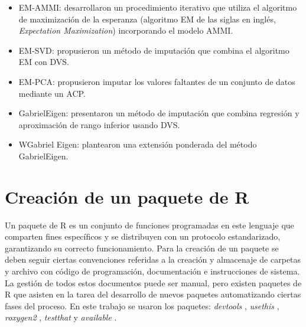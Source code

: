 \begin{itemize}
\item EM-AMMI: \citet{GauchZobel1990} desarrollaron un procedimiento iterativo que utiliza el algoritmo de maximización de la esperanza (algoritmo EM de las siglas en inglés, \emph{Expectation Maximization}) incorporando el modelo AMMI. 
\end{itemize}
\begin{itemize}
\item EM-SVD: \citet{Troyanskayaetal2001} propusieron un método de imputación que combina el algoritmo EM con DVS. 
\end{itemize}
\begin{itemize}
\item EM-PCA: \citet{JosseHusson2016} propusieron imputar los valores faltantes de un conjunto de datos mediante un ACP.
\end{itemize}
\begin{itemize}
\item GabrielEigen: \citet{Alarconetal2010} presentaron un método de imputación que combina regresión y aproximación de rango inferior usando DVS. 
\end{itemize}
\begin{itemize}
\item WGabriel Eigen: \citet{Alarconetal2014} plantearon una extensión ponderada del método GabrielEigen.
\end{itemize}


\section{Creación de un paquete de R}


Un paquete de R es un conjunto de funciones programadas en este lenguaje que comparten fines específicos y se distribuyen con un protocolo estandarizado, garantizando su correcto funcionamiento. Para la creación de un paquete se deben seguir ciertas convenciones referidas a la creación y almacenaje de carpetas y archivo con código de programación, documentación e instrucciones de sistema. La gestión de todos estos documentos puede ser manual, pero existen paquetes de R que asisten en la tarea del desarrollo de nuevos paquetes automatizando ciertas fases del proceso. En este trabajo se usaron los paquetes: \emph{devtools} \citep{Wickhametal2021}, \emph{usethis} \citep{WickhamBryan2021}, \emph{roxygen2} \citep{Wickhametal2020}, \emph{testthat} \citep{Wickham2011} y \emph{available} \citep{Ganzetal2019}. 


